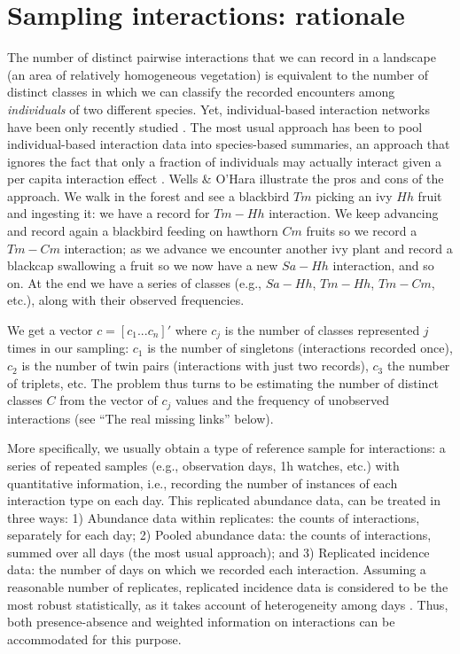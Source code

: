 \documentclass[12pt]{article}
\begin{document}
\section*{Sampling interactions: rationale}
\label{samplinginteractions:rationale}


The number of distinct pairwise interactions that we can record in a landscape (an area of relatively homogeneous vegetation) is equivalent to the number of distinct classes in which we can classify the recorded encounters among \emph{individuals} of two different species. Yet, individual-based interaction networks have been only recently studied \citep{Dupont:2011aa,Wells:2012dy}. The most usual approach has been to pool individual-based interaction data into species-based summaries, an approach that ignores the fact that only a fraction of individuals may actually interact given a per capita interaction effect \citep{Wells:2012dy}. Wells \& O'Hara \citeyearpar{Wells:2012dy} illustrate the pros and cons of the approach. We walk in the forest and see a blackbird $Tm$ picking an ivy $Hh$ fruit and ingesting it: we have a record for $Tm-Hh$ interaction. We keep advancing and record again a blackbird feeding on hawthorn $Cm$ fruits so we record a $Tm-Cm$ interaction; as we advance we encounter another ivy plant and record a blackcap swallowing a fruit so we now have a new $Sa-Hh$ interaction, and so on. At the end we have a series of classes (e.g., $Sa-Hh$, $Tm-Hh$, $Tm-Cm$, etc.), along with their observed frequencies. 

We get a vector $c= [c_1 ... c_n]'$ where $c_j$ is the number of classes represented $j$ times in our sampling: $c_1$ is the number of singletons (interactions recorded once), $c_2$ is the number of twin pairs (interactions with just two records), $c_3$ the number of triplets, etc. The problem thus turns to be estimating the number of distinct classes $C$ from the vector of $c_j$ values and the frequency of unobserved interactions (see ``The real missing links'' below). 

More specifically, we usually obtain a type of reference sample \citep{Chao:2014wm} for interactions: a series of repeated samples (e.g., observation days, 1h watches, etc.) with quantitative information, i.e., recording the number of instances of each interaction type on each day. This replicated abundance data, can be treated in three ways: 1) Abundance data within replicates: the counts of interactions, separately for each day; 2) Pooled abundance data: the counts of interactions, summed over all days (the most usual approach); and 3) Replicated incidence data: the number of days on which we recorded each interaction. Assuming a reasonable number of replicates, replicated incidence data is considered to be the most robust statistically, as it takes account of heterogeneity among days \citep{Colwell:2004fi,Colwell:2012fc,Chao:2014wm}. Thus, both presence-absence and weighted information on interactions can be accommodated for this purpose. 
\end{document}
